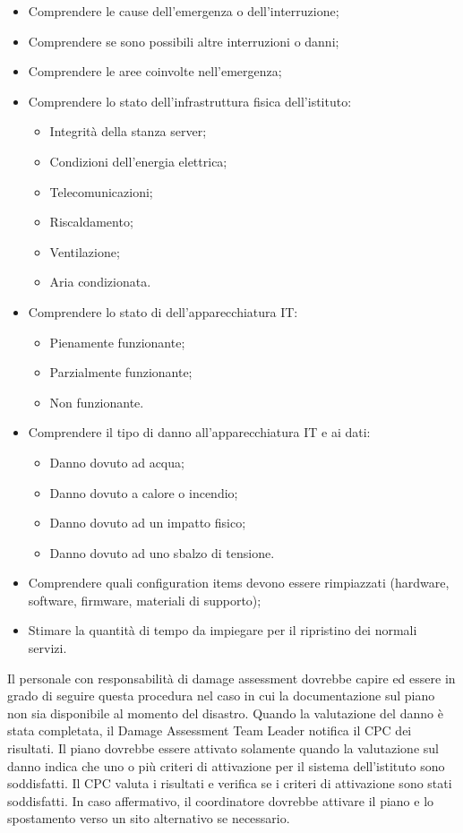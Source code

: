 \documentclass[12pt, a4paper, titlepage]{report}
\begin{document}
	\begin{itemize}
	\item Comprendere le cause dell'emergenza o dell'interruzione;
	\item Comprendere se sono possibili altre interruzioni o danni;
	\item Comprendere le aree coinvolte nell'emergenza;
	\item Comprendere lo stato dell'infrastruttura fisica dell'istituto:
	\begin{itemize}
		\item Integrità della stanza server;
		\item Condizioni dell'energia elettrica;
		\item Telecomunicazioni;
		\item Riscaldamento;
		\item Ventilazione;
		\item Aria condizionata.
	\end{itemize}
	\item Comprendere lo stato di dell'apparecchiatura IT:
	\begin{itemize}
		\item Pienamente funzionante;
		\item Parzialmente funzionante;
		\item Non funzionante.
	\end{itemize}
	\item Comprendere il tipo di danno all'apparecchiatura IT e ai dati:
	\begin{itemize}
		\item Danno dovuto ad acqua;
		\item Danno dovuto a calore o incendio;
		\item Danno dovuto ad un impatto fisico;
		\item Danno dovuto ad uno sbalzo di tensione.
	\end{itemize}
	\item Comprendere quali configuration items devono essere rimpiazzati (hardware, software, firmware, materiali di supporto);
	\item Stimare la quantità di tempo da impiegare per il ripristino dei normali servizi.
	\end{itemize}
	Il personale con responsabilità di damage assessment dovrebbe capire ed essere in grado di seguire questa procedura nel caso in cui la documentazione sul piano non sia disponibile al momento del disastro.
	Quando la valutazione del danno è stata completata, il Damage Assessment Team Leader notifica il CPC dei risultati. Il piano dovrebbe essere attivato solamente quando la valutazione sul danno indica che uno o più criteri di attivazione per il sistema dell'istituto sono soddisfatti. Il CPC valuta i risultati e verifica se i criteri di attivazione sono stati soddisfatti. In caso affermativo, il coordinatore dovrebbe attivare il piano e lo spostamento verso un sito alternativo se necessario.
\end{document}
